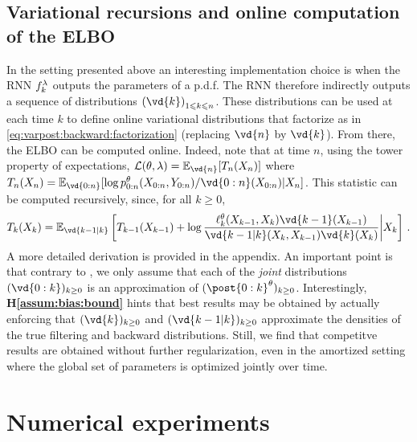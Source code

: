 \documentclass{article}
\begin{document}
\subsection{Variational recursions and online computation of the ELBO}
In the setting presented above an interesting implementation choice is when the RNN $f_{k}^\lambda$ outputs the parameters of a p.d.f. 
The RNN therefore indirectly outputs a sequence of distributions $\left(\vd{k} \right)_{1\leqslant k \leqslant n}$. 
These distributions can be used at each time $k$ to define online variational distributions that factorize as in \eqref{eq:varpost:backward:factorization} (replacing $\vd{n}$ by $\vd{k}$). From there, the ELBO can be computed online. 
Indeed, note that at time $n$, using the tower property of expectations,  $\mathcal{L}(\parvec,\parvar) = \pE_{ \vd{n}}[T_n(X_n)]$ where $T_n(X_n) = \pE_{\vd{0:n}}[\log p^{\parvec}_{0:n}(X_{0:n},Y_{0:n}) /\vd{0:n}(X_{0:n}) \vert X_n ]$. 
This statistic can be computed recursively, since, for all $k \geq 0$,
\begin{equation}
    \label{ref:eq:v_t}
    T_k(X_k) = \pE_{\vd{k-1 \vert k}}\left[T_{k-1}(X_{k-1}) + \log \frac{\qg{k}{\parvec}(X_{k-1}, X_k) \vd{k-1}(X_{k-1})} {\vd{k-1 \vert k}(X_k, X_{k-1})  \vd{k}(X_k)} \middle\vert X_k \right]\,.
\end{equation}
A more detailed derivation is provided in the appendix. 
An important point is that contrary to \cite{campbell2021online}, we only assume that each of the \textit{joint} distributions $(\vd{0:k})_{k \geq 0}$ is an approximation of $(\post{0:k}^\parvec)_{k \geq 0}$. Interestingly, \textbf{H\ref{assum:bias:bound}} hints that best results may be obtained by actually enforcing that $(\vd{k})_{k \geq 0}$ and $(\vd{k-1 \vert k})_{k \geq 0}$ approximate the densities of the true filtering and backward distributions. Still, we find that competitve results are obtained without further regularization, even in the amortized setting where the global set of parameters is optimized jointly over time. 


\section{Numerical experiments}
\label{sec:experiments}
\end{document}

